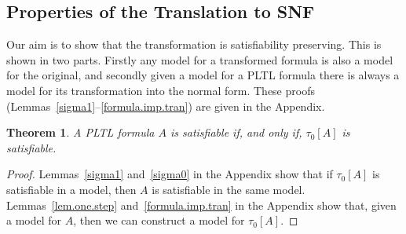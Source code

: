 \documentclass[nohyperref]{acmtrans2f}
\newtheorem{subtheorem}{Theorem}[subsection]
\begin{document}
\subsection{Properties of the Translation to SNF}
\label{snf.props}
Our aim is to show that the transformation is satisfiability preserving. 
This is shown in two parts. Firstly any model for a transformed formula is
also a model for the original, and secondly given a model for a PLTL formula
there is always a model for its transformation into the normal form.
These proofs (Lemmas~\ref{sigma1}--\ref{formula.imp.tran}) are given in the
Appendix. 

\begin{subtheorem}
\label{snf.sat}
A PLTL formula $A$ is satisfiable if, and only if, $\tau_0[A]$ is
satisfiable.
\end{subtheorem}
\begin{proof}
Lemmas~\ref{sigma1} and~\ref{sigma0} in the Appendix show that if
$\tau_0[A]$ is satisfiable in a 
model, then $A$ is satisfiable in the same model. Lemmas~\ref{lem.one.step}
and~\ref{formula.imp.tran} in the Appendix  show
that, given a model for $A$, then we can construct a model for
$\tau_0[A]$. 
\end{proof}
\end{document}
